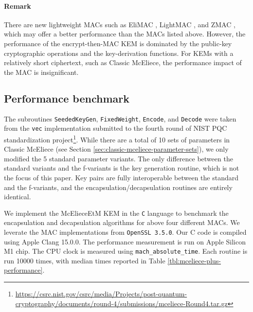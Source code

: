 \documentclass[runningheads]{llncs}
\begin{document}
\paragraph{Remark} There are new lightweight MACs such as EliMAC \cite{DBLP:journals/tosc/DobraunigMN23}, LightMAC \cite{DBLP:conf/fse/LuykxPTY16}, and ZMAC \cite{DBLP:conf/crypto/IwataMPS17}, which may offer a better performance than the MACs listed above. However, the performance of the encrypt-then-MAC KEM is dominated by the public-key cryptographic operations and the key-derivation functions. For KEMs with a relatively short ciphertext, such as Classic McEliece, the performance impact of the MAC is insignificant.

\subsection{Performance benchmark}
The subroutines \texttt{SeededKeyGen}, \texttt{FixedWeight}, \texttt{Encode}, and \texttt{Decode} were taken from the \texttt{vec} implementation submitted to the fourth round of NIST PQC standardization project\footnote{\url{https://csrc.nist.gov/csrc/media/Projects/post-quantum-cryptography/documents/round-4/submissions/mceliece-Round4.tar.gz}}. While there are a total of 10 sets of parameters in Classic McEliece (see Section \ref{sec:classic-mceliece-parameter-sets}), we only modified the 5 standard parameter variants. The only difference between the standard variants and the f-variants is the key generation routine, which is not the focus of this paper. Key pairs are fully interoperable between the standard and the f-variants, and the encapsulation/decapsulation routines are entirely identical.

We implement the McElieceEtM KEM in the {\tt C} language to benchmark the encapsulation and decapsulation algorithms for above four different MACs.  
We leverate the MAC implementations from {\tt OpenSSL 3.5.0}. Our C code is compiled using Apple Clang 15.0.0. The performance measurement is run on Apple Silicon M1 chip. The CPU clock is measured using \texttt{mach\_absolute\_time}. Each routine is run 10000 times, with median times reported in Table \ref{tbl:mceliece-plus-performance}.
\end{document}
